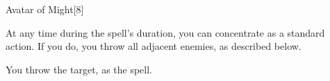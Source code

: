 \begin{spellsection}{Avatar of Might}[8]
    \begin{spellheader}
    \end{spellheader}
    \begin{spellcontent}
        \begin{spelltargetinginfo}
        \end{spelltargetinginfo}
        \begin{spelleffects}
            \spelleffect At any time during the spell's duration, you can concentrate as a standard action. If you do, you throw all adjacent enemies, as described below.
            \spelldur \durlong
        \end{spelleffects}
    \end{spellcontent}
    \begin{spellsubcontent}
        \begin{spelltargetinginfo}
        \end{spelltargetinginfo}
        \begin{spelleffects}
            \spelleffect You throw the target, as the  spell.
        \end{spelleffects}
    \end{spellsubcontent}
    \begin{spellfooter}
        \miscastexplode
    \end{spellfooter}
\end{spellsection}

